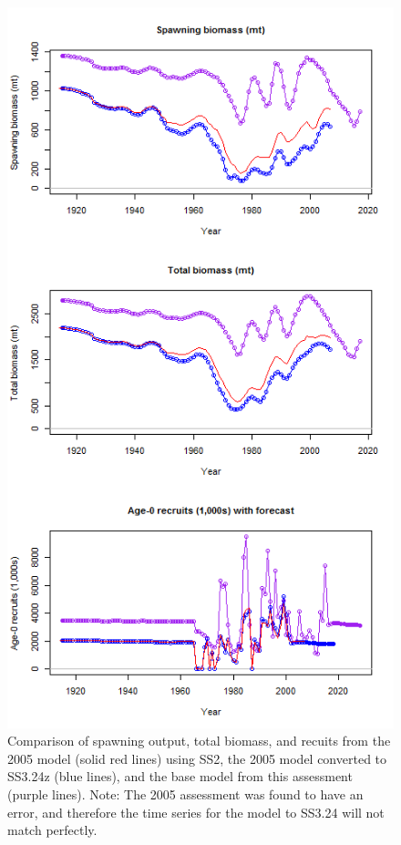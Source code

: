 \documentclass[12pt,]{article}
\begin{document}
\begin{figure}[htbp]
\centering
\includegraphics{Figures/bridge_timeseries.png}
\caption{Comparison of spawning output, total biomass, and recuits from
the 2005 model (solid red lines) using SS2, the 2005 model converted to
SS3.24z (blue lines), and the base model from this assessment (purple
lines). Note: The 2005 assessment was found to have an error, and
therefore the time series for the model to SS3.24 will not match
perfectly. \label{fig:bridge_timeseries}}
\end{figure}
\end{document}
